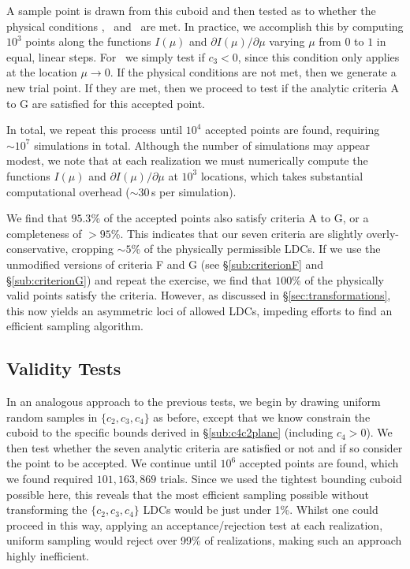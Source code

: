 A sample point is drawn from this cuboid and then tested as to whether the 
physical conditions \I, \II\ and \III\ are met. In practice, we accomplish this 
by computing $10^3$ points along the functions $I(\mu)$ and 
$\partial I(\mu)/\partial\mu$ varying $\mu$ from $0$ to $1$ in equal, linear 
steps. For \III\ we simply test if $c_3<0$, since this condition only applies
at the location $\mu\to0$. If the physical conditions are not met, then we 
generate a new trial point. If they are met, then we proceed to test if 
the analytic criteria A to G are satisfied for this accepted point.

In total, we repeat this process until $10^4$ accepted points are found, 
requiring $\sim10^7$ simulations in total. Although the number of simulations 
may appear modest, we note that at each realization we must numerically compute 
the functions $I(\mu)$ and $\partial I(\mu)/\partial\mu$ at $10^3$ locations, 
which takes substantial computational overhead ($\sim30$\,s per simulation).

We find that $95.3$\% of the accepted points also satisfy criteria A to G, or
a completeness of $>95$\%. This indicates that our seven criteria are slightly
overly-conservative, cropping $\sim5$\% of the physically permissible 
LDCs. If we use the unmodified versions of criteria F and G (see 
\S\ref{sub:criterionF} and \S\ref{sub:criterionG}) and repeat the exercise,
we find that $100$\% of the physically valid points satisfy the criteria.
However, as discussed in \S\ref{sec:transformations}, this now yields an
asymmetric loci of allowed LDCs, impeding efforts to find an efficient sampling
algorithm.

\subsection{Validity Tests}
\label{sub:validitytests}

In an analogous approach to the previous tests, we begin by drawing uniform 
random samples in $\{c_2,c_3,c_4\}$ as before, except that we know constrain the 
cuboid to the specific bounds derived in \S\ref{sub:c4c2plane} (including 
$c_4>0$). We then test whether the seven analytic criteria are satisfied or not 
and if so consider the point to be accepted. We continue until $10^6$ accepted 
points are found, which we found required $101,163,869$ trials. Since we used 
the tightest bounding cuboid possible here, this reveals that the most efficient
sampling possible without transforming the $\{c_2,c_3,c_4\}$ LDCs would be
just under 1\%. Whilst one could proceed in this way, applying an 
acceptance/rejection test at each realization, uniform sampling would reject
over 99\% of realizations, making such an approach highly inefficient.

